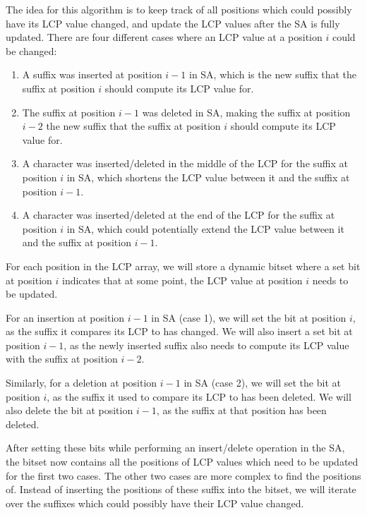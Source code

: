 The idea for this algorithm is to keep track of all positions which could possibly have
its LCP value changed, and update the LCP values after the SA is fully updated. There are
four different cases where an LCP value at a position $i$ could be changed:

\begin{enumerate}
    \item A suffix was inserted at position $i - 1$ in SA, which is the new suffix that
        the suffix at position $i$ should compute its LCP value for.

    \item The suffix at position $i - 1$ was deleted in SA, making the suffix at position
        $i - 2$ the new suffix that the suffix at position $i$ should compute its LCP
        value for.

    \item A character was inserted/deleted in the middle of the LCP for the suffix at
        position $i$ in SA, which shortens the LCP value between it and the suffix at
        position $i - 1$.

    \item A character was inserted/deleted at the end of the LCP for the suffix at
        position $i$ in SA, which could potentially extend the LCP value between it and
        the suffix at position $i - 1$.
\end{enumerate}

For each position in the LCP array, we will store a dynamic bitset where a set bit at
position $i$ indicates that at some point, the LCP value at position $i$ needs to be
updated.

For an insertion at position $i - 1$ in SA (case 1), we will set the bit at position $i$,
as the suffix it compares its LCP to has changed. We will also insert a set bit at
position $i - 1$, as the newly inserted suffix also needs to compute its LCP value with
the suffix at position $i - 2$.

Similarly, for a deletion at position $i - 1$ in SA (case 2), we will set the bit at
position $i$, as the suffix it used to compare its LCP to has been deleted. We will also
delete the bit at position $i - 1$, as the suffix at that position has been deleted.

After setting these bits while performing an insert/delete operation in the SA, the bitset
now contains all the positions of LCP values which need to be updated for the first two
cases. The other two cases are more complex to find the positions of. Instead of inserting
the positions of these suffix into the bitset, we will iterate over the suffixes which
could possibly have their LCP value changed.

